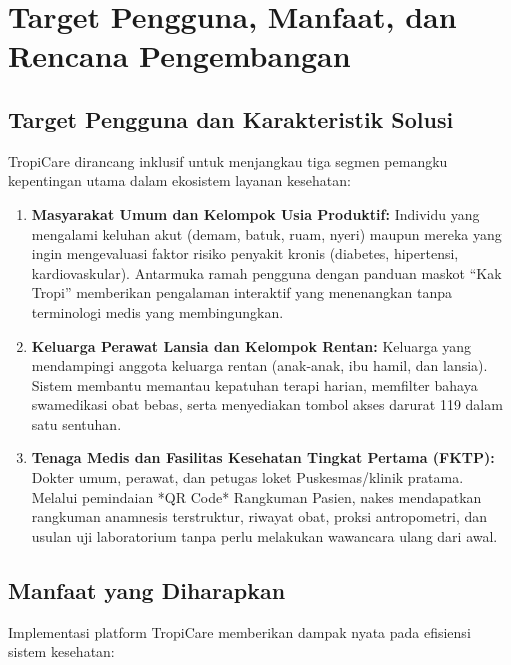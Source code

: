 
\section{Target Pengguna, Manfaat, dan Rencana Pengembangan}

\subsection{Target Pengguna dan Karakteristik Solusi}

TropiCare dirancang inklusif untuk menjangkau tiga segmen pemangku kepentingan utama dalam ekosistem layanan kesehatan:

\begin{enumerate}
    \item \textbf{Masyarakat Umum dan Kelompok Usia Produktif:} 
    Individu yang mengalami keluhan akut (demam, batuk, ruam, nyeri) maupun mereka yang ingin mengevaluasi faktor risiko penyakit kronis (diabetes, hipertensi, kardiovaskular). Antarmuka ramah pengguna dengan panduan maskot ``Kak Tropi'' memberikan pengalaman interaktif yang menenangkan tanpa terminologi medis yang membingungkan.
    
    \item \textbf{Keluarga Perawat Lansia dan Kelompok Rentan:} 
    Keluarga yang mendampingi anggota keluarga rentan (anak-anak, ibu hamil, dan lansia). Sistem membantu memantau kepatuhan terapi harian, memfilter bahaya swamedikasi obat bebas, serta menyediakan tombol akses darurat 119 dalam satu sentuhan.
    
    \item \textbf{Tenaga Medis dan Fasilitas Kesehatan Tingkat Pertama (FKTP):} 
    Dokter umum, perawat, dan petugas loket Puskesmas/klinik pratama. Melalui pemindaian *QR Code* Rangkuman Pasien, nakes mendapatkan rangkuman anamnesis terstruktur, riwayat obat, proksi antropometri, dan usulan uji laboratorium tanpa perlu melakukan wawancara ulang dari awal.
\end{enumerate}

\subsection{Manfaat yang Diharapkan}

Implementasi platform TropiCare memberikan dampak nyata pada efisiensi sistem kesehatan:

